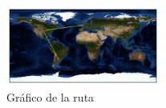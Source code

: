 \begin{figure}[H]
  \centering
    \includegraphics[width=0.45\textwidth]{grafico-rutas/birmingham-ac-uk.png}
  \caption{Gráfico de la ruta}
  \label{entropia-s}
\end{figure}